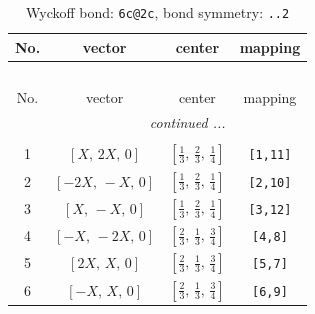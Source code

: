 \documentclass[fleqn,8pt]{jsarticle}
\begin{document}
\renewcommand{\arraystretch}{1.2}
\begin{longtable}{cccc}
\caption{Wyckoff bond: {\tt 6c@2c}, bond symmetry: {\tt ..2}}
 \\
 \hline \hline
No. & vector & center & mapping \\ \hline \endfirsthead

\multicolumn{3}{l}{\tablename\ \thetable{}} \\
 \hline \hline
No. & vector & center & mapping \\ \hline \endhead

 \hline \hline
\multicolumn{3}{r}{\footnotesize\it continued ...} \\ \endfoot

 \hline \hline
\multicolumn{3}{r}{} \\ \endlastfoot

1 & $\left[ X,\, 2 X,\, 0 \right]$ & $\left[ \frac{1}{3},\, \frac{2}{3},\, \frac{1}{4} \right]$ & {\tt [1,11]} \\ \hline
2 & $\left[ - 2 X,\, - X,\, 0 \right]$ & $\left[ \frac{1}{3},\, \frac{2}{3},\, \frac{1}{4} \right]$ & {\tt [2,10]} \\ \hline
3 & $\left[ X,\, - X,\, 0 \right]$ & $\left[ \frac{1}{3},\, \frac{2}{3},\, \frac{1}{4} \right]$ & {\tt [3,12]} \\ \hline
4 & $\left[ - X,\, - 2 X,\, 0 \right]$ & $\left[ \frac{2}{3},\, \frac{1}{3},\, \frac{3}{4} \right]$ & {\tt [4,8]} \\ \hline
5 & $\left[ 2 X,\, X,\, 0 \right]$ & $\left[ \frac{2}{3},\, \frac{1}{3},\, \frac{3}{4} \right]$ & {\tt [5,7]} \\ \hline
6 & $\left[ - X,\, X,\, 0 \right]$ & $\left[ \frac{2}{3},\, \frac{1}{3},\, \frac{3}{4} \right]$ & {\tt [6,9]} \\
\end{longtable}
\renewcommand{\arraystretch}{1.2}
\end{document}
